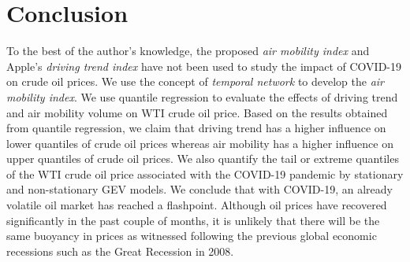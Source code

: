 \documentclass[review]{elsarticle}
\begin{document}
		



\section{Conclusion}\label{sec:concl}
To the best of the author's knowledge, the proposed \textit{air mobility index} and Apple's \textit{driving trend index} have not been used to study the impact of COVID-19 on crude oil prices. We use the concept of \textit {temporal network} to develop the \textit{air mobility index}. We use quantile regression to evaluate the effects of driving trend and air mobility volume on WTI crude oil price. Based on the results obtained from quantile regression, we claim that driving trend has a higher influence on lower quantiles of crude oil prices whereas air mobility has a higher influence on upper quantiles of crude oil prices. We also quantify the tail or extreme quantiles of the WTI crude oil price associated with the COVID-19 pandemic by stationary and non-stationary GEV models. We conclude that with COVID-19, an already volatile oil market has reached a flashpoint. Although oil prices have recovered significantly in the past couple of months,  it is unlikely that there will be the same buoyancy in prices as witnessed following the previous global economic recessions such as the Great Recession in 2008.


\newpage
\end{document}

